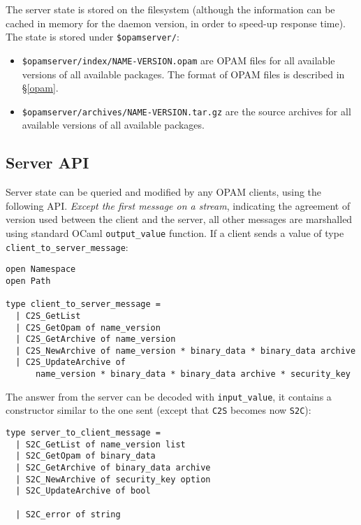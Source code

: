 \documentclass[a4paper,11pt]{article}
\begin{document}
The server state is stored on the filesystem (although the information
can be cached in memory for the daemon version, in order to speed-up
response time). The state is stored under {\tt \$opamserver/}:

\begin{itemize}

\item {\tt \$opamserver/index/NAME-VERSION.opam} are OPAM files
  for all available versions of all available packages. The format of
  OPAM files is described in \S\ref{opam}.

\item {\tt \$opamserver/archives/NAME-VERSION.tar.gz} are the
  source archives for all available versions of all available
  packages.

\end{itemize}

\subsection{Server API}
\label{api}

Server state can be queried and modified by any OPAM clients, using
the following API. {\em Except the first message on a stream},
indicating the agreement of version used between the client and 
the server, all
other messages are marshalled using standard OCaml \verb-output_value-
function.
If a client sends a value of type \verb|client_to_server_message|:

\begin{verbatim}
open Namespace
open Path

type client_to_server_message =
  | C2S_GetList
  | C2S_GetOpam of name_version
  | C2S_GetArchive of name_version
  | C2S_NewArchive of name_version * binary_data * binary_data archive
  | C2S_UpdateArchive of 
      name_version * binary_data * binary_data archive * security_key
\end{verbatim}

The answer from the server can be decoded with \verb|input_value|, 
it contains a constructor similar to the one sent 
(except that \verb|C2S| becomes now \verb|S2C|):

\begin{verbatim}
type server_to_client_message =
  | S2C_GetList of name_version list
  | S2C_GetOpam of binary_data
  | S2C_GetArchive of binary_data archive
  | S2C_NewArchive of security_key option
  | S2C_UpdateArchive of bool

  | S2C_error of string
\end{verbatim}
\end{document}
